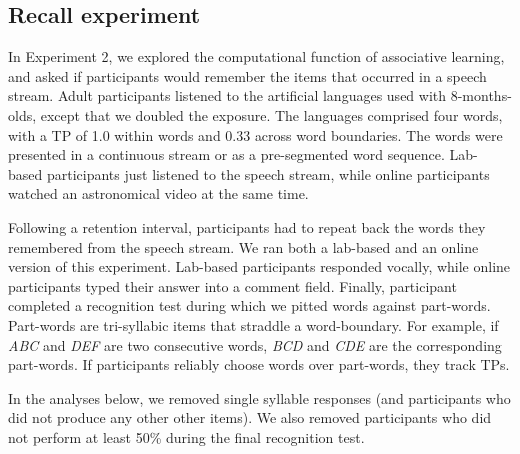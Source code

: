 \documentclass[
]{article}
\begin{document}
\clearpage

\subsection{Recall experiment}\label{recall-experiment-1}

In Experiment 2, we explored the computational function of associative
learning, and asked if participants would remember the items that
occurred in a speech stream. Adult participants listened to the
artificial languages \citet{Saffran-Science} used with 8-months-olds,
except that we doubled the exposure. The languages comprised four words,
with a TP of 1.0 within words and 0.33 across word boundaries. The words
were presented in a continuous stream or as a pre-segmented word
sequence. Lab-based participants just listened to the speech stream,
while online participants watched an astronomical video at the same
time.

Following a retention interval, participants had to repeat back the
words they remembered from the speech stream. We ran both a lab-based
and an online version of this experiment. Lab-based participants
responded vocally, while online participants typed their answer into a
comment field. Finally, participant completed a recognition test during
which we pitted words against part-words. Part-words are tri-syllabic
items that straddle a word-boundary. For example, if \emph{ABC} and
\emph{DEF} are two consecutive words, \emph{BCD} and \emph{CDE} are the
corresponding part-words. If participants reliably choose words over
part-words, they track TPs.

In the analyses below, we removed single syllable responses (and
participants who did not produce any other other items). We also removed
participants who did not perform at least 50\% during the final
recognition test.
\end{document}
